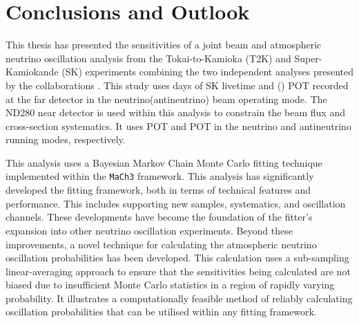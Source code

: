 \chapter{Conclusions and Outlook}

This thesis has presented the sensitivities of a joint beam and atmospheric neutrino oscillation analysis from the Tokai-to-Kamioka (T2K) and Super-Kamiokande (SK) experiments combining the two independent analyses presented by the collaborations \cite{Dunne2020-uf,Jiang2019-iw}. This study uses  days of SK livetime and () POT recorded at the far detector in the neutrino(antineutrino) beam operating mode. The ND280 near detector is used within this analysis to constrain the beam flux and cross-section systematics. It uses POT and POT in the neutrino and antineutrino running modes, respectively.


This analysis uses a Bayesian Markov Chain Monte Carlo fitting technique implemented within the \texttt{MaCh3} framework. This analysis has significantly developed the fitting framework, both in terms of technical features and performance. This includes supporting new samples, systematics, and oscillation channels. These developments have become the foundation of the fitter's expansion into other neutrino oscillation experiments. Beyond these improvements, a novel technique for calculating the atmospheric neutrino oscillation probabilities has been developed. This calculation uses a sub-sampling linear-averaging approach to ensure that the sensitivities being calculated are not biased due to insufficient Monte Carlo statistics in a region of rapidly varying probability. It illustrates a computationally feasible method of reliably calculating oscillation probabilities that can be utilised within any fitting framework.


